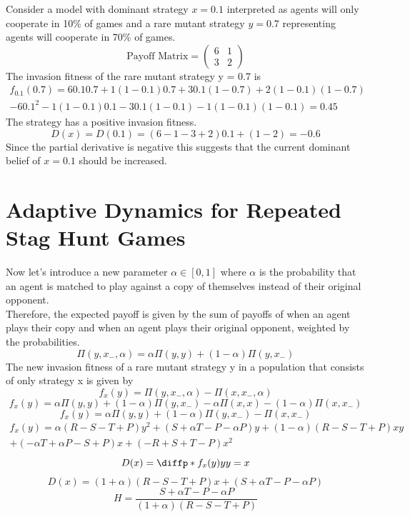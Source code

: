 \documentclass[]{llncs}
\begin{document}
Consider a model with dominant strategy $x = 0.1$ interpreted as agents will only cooperate in 10\% of games and a rare mutant strategy $y = 0.7$ representing agents will cooperate in 70\% of games. 
\[
   \text{Payoff Matrix} = \begin{pmatrix} 
   6 & 1  \\
   3 & 2  
   \end{pmatrix} 
\]
The invasion fitness of the rare mutant strategy y = 0.7 is 
\begin{multline}
f_{0.1}(0.7) = 6 0.1 0.7 + 1 (1-0.1) 0.7 +  3 0.1 (1-0.7) + 2 (1-0.1) (1-0.7) \\ - 6 0.1^2 - 1 (1-0.1) 0.1 - 3 0.1 (1-0.1) - 1 (1-0.1) (1-0.1) = 0.45
\end{multline}
The strategy has a positive invasion fitness.
\[
D(x) = D(0.1) = (6 - 1 - 3 +2) 0.1 + (1-2) = -0.6
\]
Since the partial derivative is negative this suggests that the current dominant belief of $x = 0.1$ should be increased. 


\section{Adaptive Dynamics for Repeated Stag Hunt Games}

Now let's introduce a new parameter $\alpha \in [0, 1]$ where $\alpha$ is the probability that an agent is matched to play against a copy of themselves instead of their original opponent. 
\\
Therefore, the expected payoff is given by the sum of payoffs of when an agent plays their copy and when an agent plays their original opponent, weighted by the probabilities.
\[ 
\Pi ( y, x_{-}, \alpha ) = \alpha \Pi ( y, y) + (1-\alpha) \Pi ( y, x_{-} )
\]
The new invasion fitness of a rare mutant strategy y in a population that consists of only strategy x is given by 
\[
f_x(y) = \Pi ( y, x_{-}, \alpha ) - \Pi ( x, x_{-}, \alpha )
\]
\[
f_x(y) = \alpha \Pi ( y, y) + (1-\alpha) \Pi ( y, x_{-} ) - \alpha \Pi ( x, x) - (1-\alpha) \Pi ( x,  x_{-} )
\]
\[
f_x(y) = \alpha \Pi ( y, y) + (1-\alpha) \Pi ( y, x_{-} ) - \Pi ( x,  x_{-} )
\]
\begin{multline}
f_x(y) = \alpha (R-S-T+P) y^2 +(S + \alpha T - P - \alpha P) y + (1-\alpha) (R-S-T+P) x y \\+ (-\alpha T + \alpha P - S + P) x + (-R+S+T-P) x^2
\end{multline}
\[
D(x) = \diffp*{f_x(y)}{y}{y=x}
\]
\[
D(x) = (1+\alpha) (R-S-T+P) x + (S + \alpha T - P - \alpha P) 
\]
\[
H = \frac{S + \alpha T - P - \alpha P}{(1+\alpha)(R-S-T+P)}
\]
\end{document}
